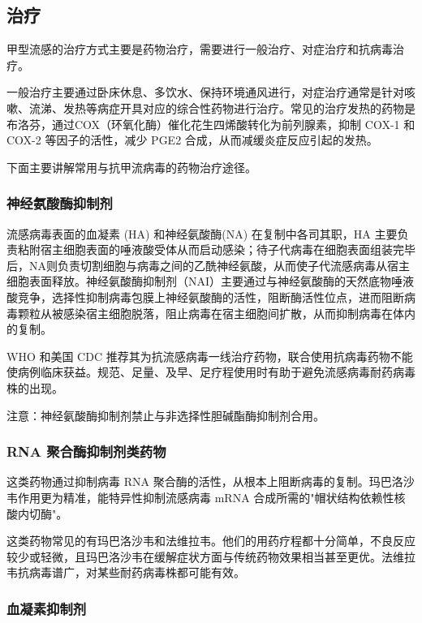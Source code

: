 \documentclass[9pt,a4paper,twoside]{rho-class/rho}
\begin{document}
\subsection{治疗}

    甲型流感的治疗方式主要是药物治疗，需要进行一般治疗、对症治疗和抗病毒治疗。

    一般治疗主要通过卧床休息、多饮水、保持环境通风进行，对症治疗通常是针对咳嗽、流涕、发热等病症开具对应的综合性药物进行治疗。常见的治疗发热的药物是布洛芬，通过COX（环氧化酶）催化花生四烯酸转化为前列腺素，抑制 COX-1 和 COX-2 等因子的活性，减少 PGE2 合成，从而减缓炎症反应引起的发热。 

    下面主要讲解常用与抗甲流病毒的药物治疗途径。

    \subsubsection{神经氨酸酶抑制剂}

    流感病毒表面的血凝素 (HA) 和神经氨酸酶(NA) 在复制中各司其职，HA 主要负责粘附宿主细胞表面的唾液酸受体从而启动感染；待子代病毒在细胞表面组装完毕后，NA则负责切割细胞与病毒之间的乙酰神经氨酸，从而使子代流感病毒从宿主细胞表面释放。神经氨酸酶抑制剂（NAI）主要通过与神经氨酸酶的天然底物唾液酸竞争，选择性抑制病毒包膜上神经氨酸酶的活性，阻断酶活性位点，进而阻断病毒颗粒从被感染宿主细胞脱落，阻止病毒在宿主细胞间扩散，从而抑制病毒在体内的复制。

    WHO 和美国 CDC 推荐其为抗流感病毒一线治疗药物，联合使用抗病毒药物不能使病例临床获益。规范、足量、及早、足疗程使用时有助于避免流感病毒耐药病毒株的出现。
    
    注意：神经氨酸酶抑制剂禁止与非选择性胆碱酯酶抑制剂合用。

    \subsubsection{RNA 聚合酶抑制剂类药物}

    这类药物通过抑制病毒 RNA 聚合酶的活性，从根本上阻断病毒的复制。玛巴洛沙韦作用更为精准，能特异性抑制流感病毒 mRNA 合成所需的"帽状结构依赖性核酸内切酶"。

    这类药物常见的有玛巴洛沙韦和法维拉韦。他们的用药疗程都十分简单，不良反应较少或轻微，且玛巴洛沙韦在缓解症状方面与传统药物效果相当甚至更优。法维拉韦抗病毒谱广，对某些耐药病毒株都可能有效。

    \subsubsection{血凝素抑制剂}
\end{document}
